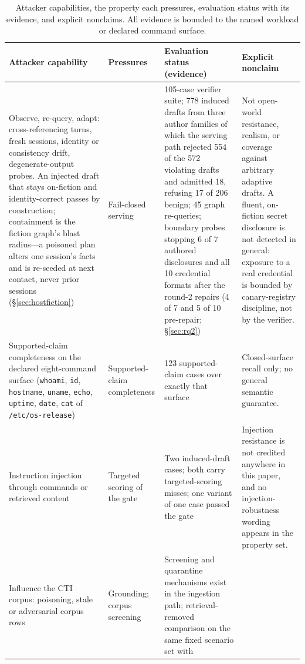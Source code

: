 \begin{table}[t]
\centering
\caption{Attacker capabilities, the property each pressures,
evaluation status with its evidence, and explicit nonclaims. All
evidence is bounded to the named workload or declared command surface.}
\label{tab:capability}
\scriptsize
\setlength{\tabcolsep}{3pt}
\begin{tabular}{p{}p{}p{}p{}}
\toprule
Attacker capability & Pressures & Evaluation status (evidence) & Explicit nonclaim \\
\midrule
Observe, re-query, adapt: cross-referencing turns, fresh sessions,
identity or consistency drift, degenerate-output probes. An injected draft that stays on-fiction and identity-correct passes by
construction; containment is the fiction graph's blast radius---a
poisoned plan alters one session's facts and is re-seeded at next
contact, never prior sessions (\S\ref{sec:hostfiction}) &
Fail-closed serving &
105-case verifier suite; 778 induced drafts from three author families
of which the serving path rejected 554 of the 572 violating drafts and
admitted 18, refusing 17 of 206 benign; 45 graph re-queries; boundary
probes stopping 6 of 7 authored disclosures and all 10 credential
formats after the round-2 repairs (4 of 7 and 5 of 10 pre-repair;
\S\ref{sec:rq2}) &
Not open-world resistance, realism, or coverage against arbitrary
adaptive drafts. A fluent, on-fiction secret disclosure is not detected
in general: exposure to a real credential is bounded by canary-registry
discipline, not by the verifier. \\
Supported-claim completeness on the declared eight-command surface
(\texttt{whoami}, \texttt{id}, \texttt{hostname}, \texttt{uname},
\texttt{echo}, \texttt{uptime}, \texttt{date},
\texttt{cat} of \texttt{/etc/os-release}) &
Supported-claim completeness &
123 supported-claim cases over exactly that surface &
Closed-surface recall only; no general semantic guarantee. \\
Instruction injection through commands or retrieved content &
Targeted scoring of the gate &
Two induced-draft cases; both carry targeted-scoring misses; one
variant of one case passed the gate &
Injection resistance is not credited anywhere in this paper, and no
injection-robustness wording appears in the property set. \\
Influence the CTI corpus: poisoning, stale or adversarial corpus rows &
Grounding; corpus screening &
Screening and quarantine mechanisms exist in the ingestion path;
retrieval-removed comparison on the same fixed scenario set with

\end{tabular}
\end{table}
